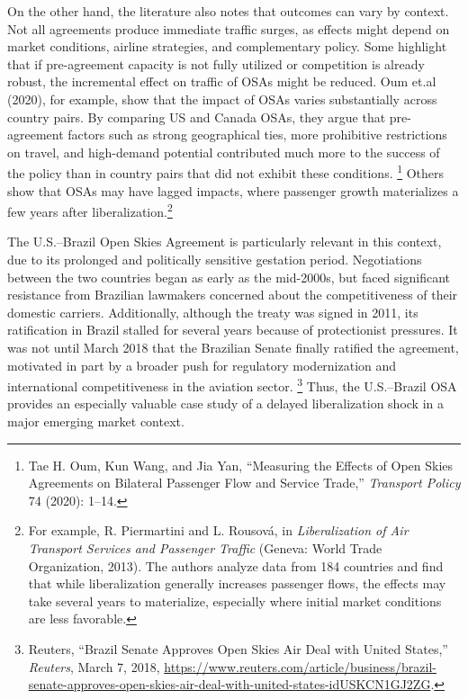 \documentclass[12pt]{article}
\begin{document}
On the other hand, the literature also notes that outcomes can vary by context. Not all agreements produce immediate traffic surges, as effects might depend on market conditions, airline strategies, and complementary policy. Some highlight that if pre-agreement capacity is not fully utilized or competition is already robust, the incremental effect on traffic of OSAs might be reduced.  Oum et.al (2020), for example, show that the impact of OSAs varies substantially across country pairs. By comparing US and Canada OSAs, they argue that pre-agreement factors such as strong geographical ties, more prohibitive restrictions on travel, and high-demand potential contributed much more to the success of the policy than in country pairs that did not exhibit these conditions. \footnote{Tae H. Oum, Kun Wang, and Jia Yan, “Measuring the Effects of Open Skies Agreements on Bilateral Passenger Flow and Service Trade,” \textit{Transport Policy} 74 (2020): 1–14.} Others show that OSAs may have lagged impacts, where passenger growth materializes a few years after liberalization.\footnote{For example, R. Piermartini and L. Rousová, in \textit{Liberalization of Air Transport Services and Passenger Traffic} (Geneva: World Trade Organization, 2013). The authors analyze data from 184 countries and find that while liberalization generally increases passenger flows, the effects may take several years to materialize, especially where initial market conditions are less favorable.} 

The U.S.–Brazil Open Skies Agreement is particularly relevant in this context, due to its prolonged and politically sensitive gestation period. Negotiations between the two countries began as early as the mid-2000s, but faced significant resistance from Brazilian lawmakers concerned about the competitiveness of their domestic carriers. Additionally, although the treaty was signed in 2011, its ratification in Brazil stalled for several years because of protectionist pressures. It was not until March 2018 that the Brazilian Senate finally ratified the agreement, motivated in part by a broader push for regulatory modernization and international competitiveness in the aviation sector. \footnote{Reuters, “Brazil Senate Approves Open Skies Air Deal with United States,” \textit{Reuters}, March 7, 2018, \url{https://www.reuters.com/article/business/brazil-senate-approves-open-skies-air-deal-with-united-states-idUSKCN1GJ2ZG}.} Thus, the U.S.–Brazil OSA provides an especially valuable case study of a delayed liberalization shock in a major emerging market context.
\end{document}
